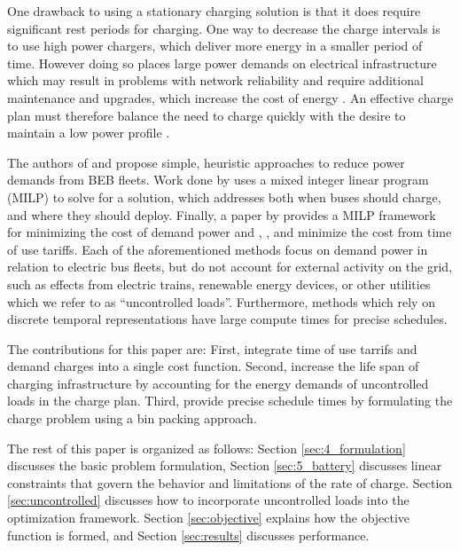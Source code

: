 \par One drawback to using a stationary charging solution is that it does require significant rest periods for charging. One way to decrease the charge intervals is to use high power chargers, which deliver more energy in a smaller period of time. However doing so places large power demands on electrical infrastructure \cite{stahleder_impact_2019} which may result in problems with network reliability \cite{deb_impact_2017} and require additional maintenance and upgrades, which increase the cost of energy \cite{boonraksa_impact_2019}. An effective charge plan must therefore balance the need to charge quickly with the desire to maintain a low power profile \cite{ojer_development_2020}.
\par The authors of \cite{qin_numerical_2016} and \cite{Wang2019} propose simple, heuristic approaches to reduce power demands from BEB fleets. Work done by \cite{bagherinezhad_spatio-temporal_2020} uses a mixed integer linear program (MILP) to solve for a solution, which addresses both when buses should charge, and where they should deploy. Finally, a paper by \cite{He_2019_Fast} provides a MILP framework for minimizing the cost of demand power and \cite{He_2022_Battery}, \cite{Liu_2022_Optimal}, and \cite{whitaker_network_nodate} minimize the cost from time of use tariffs. Each of the aforementioned methods focus on demand power in relation to electric bus fleets, but do not account for external activity on the grid, such as effects from electric trains, renewable energy devices, or other utilities which we refer to as ``uncontrolled loads''. Furthermore, methods which rely on discrete temporal representations \cite{whitaker_network_nodate} have large compute times for precise schedules.
\par The contributions for this paper are: First, integrate time of use tarrifs and demand charges into a single cost function. Second, increase the life span of charging infrastructure by accounting for the energy demands of uncontrolled loads in the charge plan. Third, provide precise schedule times by formulating the charge problem using a bin packing approach.
\par The rest of this paper is organized as follows: Section \ref{sec:4_formulation} discusses the basic problem formulation, Section \ref{sec:5_battery} discusses linear constraints that govern the behavior and limitations of the rate of charge. Section \ref{sec:uncontrolled} discusses how to incorporate uncontrolled loads into the optimization framework. Section \ref{sec:objective} explains how the objective function is formed, and Section \ref{sec:results} discusses performance.

